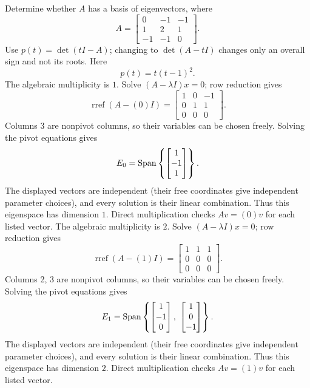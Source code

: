 \goal Determine whether $A$ has a basis of eigenvectors, where
\[A=\begin{bmatrix}0&-1&-1\\1&2&1\\-1&-1&0\end{bmatrix}.\]
Use $p(t)=\det(tI-A)$; changing to $\det(A-tI)$ changes only an overall sign and not its roots. Here
\[p(t)=t \left(t - 1\right)^{2}.\]
The algebraic multiplicity is $1$. Solve $(A-\lambda I)x=0$; row reduction gives
\[\operatorname{rref}(A-(0)I)=\begin{bmatrix}1&0&-1\\0&1&1\\0&0&0\end{bmatrix}.\]
Columns 3 are nonpivot columns, so their variables can be chosen freely. Solving the pivot equations gives
\[E_{0}=\operatorname{Span}\left\{\begin{bmatrix}1\\-1\\1\end{bmatrix}\right\}.\]
The displayed vectors are independent (their free coordinates give independent parameter choices), and every solution is their linear combination. Thus this eigenspace has dimension $1$. Direct multiplication checks $Av=(0)v$ for each listed vector.
The algebraic multiplicity is $2$. Solve $(A-\lambda I)x=0$; row reduction gives
\[\operatorname{rref}(A-(1)I)=\begin{bmatrix}1&1&1\\0&0&0\\0&0&0\end{bmatrix}.\]
Columns 2, 3 are nonpivot columns, so their variables can be chosen freely. Solving the pivot equations gives
\[E_{1}=\Span\left\{\begin{bmatrix}1\\-1\\0\end{bmatrix},\ \begin{bmatrix}1\\0\\-1\end{bmatrix}\right\}.\]
The displayed vectors are independent (their free coordinates give independent parameter choices), and every solution is their linear combination. Thus this eigenspace has dimension $2$. Direct multiplication checks $Av=(1)v$ for each listed vector.
